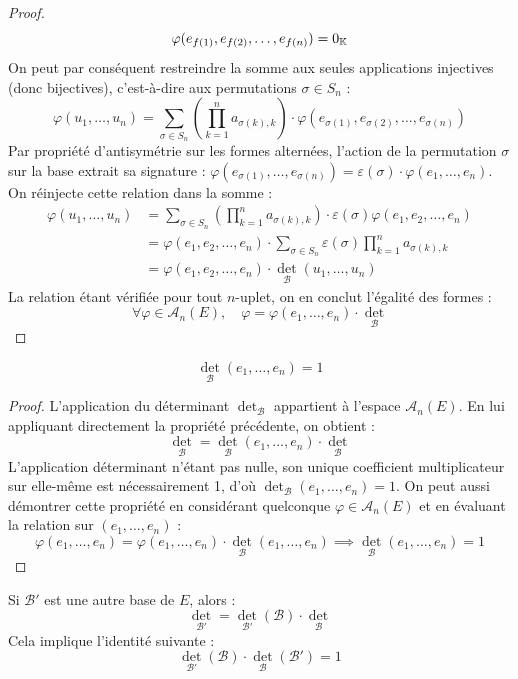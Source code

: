 \documentclass[12pt, a4paper]{report}
\begin{document}
\begin{proof}
    $$\varphi(e_{f(1)}, e_{f(2)}, \dots, e_{f(n)}) = 0_{\mathbb{K}}$$
    On peut par conséquent restreindre la somme aux seules applications injectives (donc bijectives), c'est-à-dire aux permutations $\sigma \in S_n$ :
    $$\varphi(u_1,\dots,u_n) = \sum_{\sigma \in S_n} \left(\prod_{k=1}^n a_{\sigma(k),k}\right) \cdot \varphi(e_{\sigma(1)}, e_{\sigma(2)}, \dots, e_{\sigma(n)})$$
    Par propriété d'antisymétrie sur les formes alternées, l'action de la permutation $\sigma$ sur la base extrait sa signature : $\varphi(e_{\sigma(1)}, \dots, e_{\sigma(n)}) = \varepsilon(\sigma) \cdot \varphi(e_1, \dots, e_n)$. On réinjecte cette relation dans la somme :
    \begin{align*}
        \varphi(u_1,\dots,u_n) &= \sum_{\sigma \in S_n} \left(\prod_{k=1}^n a_{\sigma(k),k}\right) \cdot \varepsilon(\sigma) \varphi(e_1, e_2, \dots, e_n) \\
        &= \varphi(e_1, e_2, \dots, e_n) \cdot \sum_{\sigma \in S_n} \varepsilon(\sigma) \prod_{k=1}^n a_{\sigma(k),k} \\
        &= \varphi(e_1, e_2, \dots, e_n) \cdot \det_{\mathcal{B}}(u_1, \dots, u_n)
    \end{align*}
    La relation étant vérifiée pour tout $n$-uplet, on en conclut l'égalité des formes :
    $$\forall \varphi \in \mathscr A_n(E), \quad \varphi = \varphi(e_1, \dots, e_n) \cdot \det_{\mathcal{B}}$$
\end{proof}

\begin{property}
    $$\det_{\mathcal{B}}(e_1, \dots, e_n) = 1$$
\end{property}

\begin{proof}
    L'application du déterminant $\det_\mathcal{B}$ appartient à l'espace $\mathscr A_n(E)$. En lui appliquant directement la propriété précédente, on obtient :
    $$\det_\mathcal{B} = \det_\mathcal{B}(e_1, \dots, e_n) \cdot \det_\mathcal{B}$$
    L'application déterminant n'étant pas nulle, son unique coefficient multiplicateur sur elle-même est nécessairement 1, d'où $\det_{\mathcal{B}}(e_1, \dots, e_n) = 1$.
    On peut aussi démontrer cette propriété en considérant quelconque $\varphi \in \mathscr A_n(E)$ et en évaluant la relation sur $(e_1, \dots, e_n)$ :
        $$\varphi(e_1, \dots, e_n) = \varphi(e_1, \dots, e_n) \cdot \det_{\mathcal{B}}(e_1, \dots, e_n) \implies \det_{\mathcal{B}}(e_1, \dots, e_n) = 1$$
\end{proof}

\begin{property}
    Si $\mathcal{B}'$ est une autre base de $E$, alors :
    $$\det_{\mathcal{B}'} = \det_{\mathcal{B}'}(\mathcal B) \cdot \det_{\mathcal{B}}$$
    Cela implique l'identité suivante :
    $$\det_{\mathcal{B'}}(\mathcal B) \cdot \det_{\mathcal{B}}(\mathcal{B}') = 1$$
\end{property}
\end{document}
